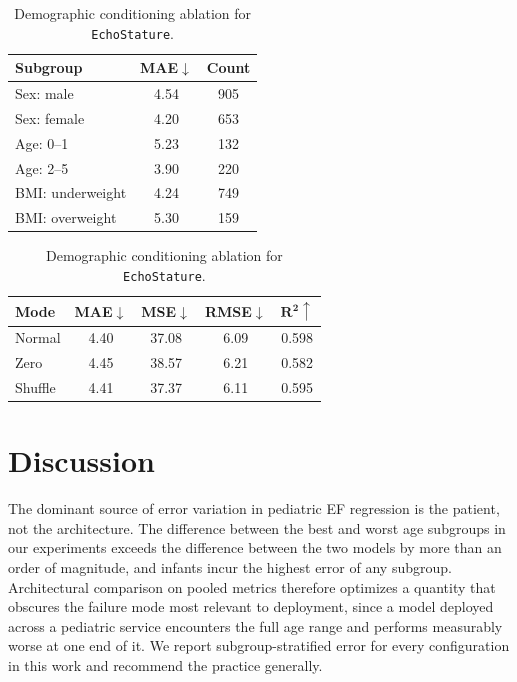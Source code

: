 \documentclass{ws-procs11x85}
\begin{document}
\begin{table}[t]

\begin{minipage}[t]{0.46\textwidth}

\caption{Subgroup performance for \texttt{EchoStature} on the validation set.}
\label{tab:subgroup_results}
\small
\setlength{\tabcolsep}{6pt}
\renewcommand{\arraystretch}{1.1}
\begin{tabular}{lcc}
\toprule
\textbf{Subgroup} &
\textbf{MAE}$\downarrow$ &
\textbf{Count}\\
\midrule
Sex: male & 4.54 & 905\\
Sex: female & 4.20 & 653\\
Age: 0--1 & 5.23 & 132\\
Age: 2--5 & 3.90 & 220\\
BMI: underweight & 4.24 & 749\\
BMI: overweight & 5.30 & 159\\
\bottomrule
\end{tabular}
\end{minipage}
\hfill
\begin{minipage}[t]{0.51\textwidth}
\centering
\caption{Demographic conditioning ablation for \texttt{EchoStature}.}
\label{tab:demo_conditioning_ablation}
\small
\setlength{\tabcolsep}{4pt}
\renewcommand{\arraystretch}{1.05}
\begin{tabular}{lcccc}
\toprule
\textbf{Mode} &
\textbf{MAE}$\downarrow$ &
\textbf{MSE}$\downarrow$ &
\textbf{RMSE}$\downarrow$ &
$\mathbf{R^2}\uparrow$\\
\midrule
Normal & 4.40 & 37.08 & 6.09 & 0.598\\
Zero & 4.45 & 38.57 & 6.21 & 0.582\\
Shuffle & 4.41 & 37.37 & 6.11 & 0.595\\
\bottomrule
\end{tabular}
\end{minipage}
\end{table}

\section{Discussion}

The dominant source of error variation in pediatric EF regression is the patient, not the architecture.
The difference between the best and worst age subgroups in our experiments exceeds the difference between the two models by more than an order of magnitude, and infants incur the highest error of any subgroup.
Architectural comparison on pooled metrics therefore optimizes a quantity that obscures the failure mode most relevant to deployment, since a model deployed across a pediatric service encounters the full age range and performs measurably worse at one end of it.
We report subgroup-stratified error for every configuration in this work and recommend the practice generally.
\end{document}

